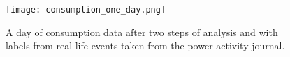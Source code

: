 \begin{figure}
  \begin{center}
    \texttt{[image: consumption\_one\_day.png]}
  \end{center}
  \caption{A day of consumption data after two steps of analysis and with labels from real life events taken from the power activity journal.}
  \label{consumption_one_day}
\end{figure}


